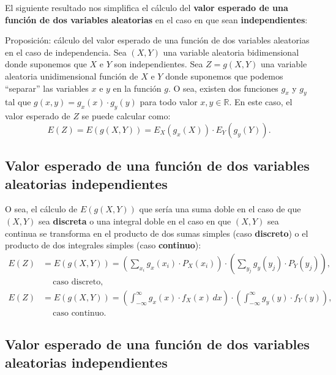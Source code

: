 \documentclass[]{book}
\begin{document}
El siguiente resultado nos simplifica el cálculo del \textbf{valor esperado de una función de dos variables aleatorias} en el caso en que sean \textbf{independientes}:

Proposición: cálculo del valor esperado de una función de dos variables aleatorias en el caso de independencia.
Sea \((X,Y)\) una variable aleatoria bidimensional donde suponemos que \(X\) e \(Y\) son independientes.
Sea \(Z=g(X,Y)\) una variable aleatoria unidimensional función de \(X\) e \(Y\) donde suponemos que podemos ``separar'' las variables \(x\) e \(y\) en la función \(g\). O sea, existen dos funciones \(g_x\) y \(g_y\) tal que \(g(x,y)=g_x(x)\cdot g_y(y)\) para todo valor \(x,y\in\mathbb{R}\). En este caso, el valor esperado de \(Z\) se puede calcular como:
\[
E(Z)=E(g(X,Y))=E_X(g_x(X))\cdot E_Y(g_y(Y)).
\]

\hypertarget{valor-esperado-de-una-funciuxf3n-de-dos-variables-aleatorias-independientes-1}{%
\subsection{Valor esperado de una función de dos variables aleatorias independientes}\label{valor-esperado-de-una-funciuxf3n-de-dos-variables-aleatorias-independientes-1}}

O sea, el cálculo de \(E(g(X,Y))\) que sería una suma doble en el caso de que \((X,Y)\) sea \textbf{discreta} o una integral doble en el caso en que \((X,Y)\) sea continua se transforma en el producto de dos sumas simples (caso \textbf{discreto}) o el producto de dos integrales simples (caso \textbf{continuo}):
\[
\begin{array}{rl}
E(Z) & =E(g(X,Y))=\left(\sum_{x_i} g_x(x_i)\cdot P_X(x_i)\right)\cdot \left(\sum_{y_j} g_y(y_j)\cdot P_Y(y_j)\right),\\ &\ \quad \mbox{caso discreto},\\
E(Z) & =E(g(X,Y))=\left(\int_{-\infty}^\infty g_x(x)\cdot f_X(x)\, dx\right)\cdot \left(\int_{-\infty}^\infty g_y(y)\cdot f_Y(y)\right), \\  &\ \quad \mbox{caso continuo}.
\end{array}
\]

\hypertarget{valor-esperado-de-una-funciuxf3n-de-dos-variables-aleatorias-independientes-2}{%
\subsection{Valor esperado de una función de dos variables aleatorias independientes}\label{valor-esperado-de-una-funciuxf3n-de-dos-variables-aleatorias-independientes-2}}
\end{document}
